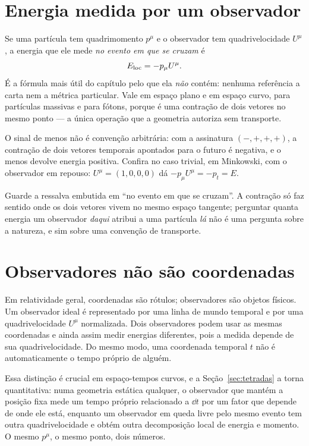 \documentclass[12pt,a4paper,oneside]{book}
\theoremstyle{rgplain}
\theoremstyle{rgremark}
\begin{document}
\section{Energia medida por um observador}
\label{sec:energia-observada}

\begin{central}
Se uma partícula tem quadrimomento $p^\mu$ e o observador tem quadrivelocidade
$U^\mu$, a energia que ele mede \emph{no evento em que se cruzam} é
\begin{equation}
  E_{\rm loc}=-p_\mu U^\mu .
  \label{eq:energia-medida}
\end{equation}
É a fórmula mais útil do capítulo pelo que ela \emph{não} contém: nenhuma
referência a carta nem a métrica particular. Vale em espaço plano e em espaço
curvo, para partículas massivas e para fótons, porque é uma contração de dois
vetores no mesmo ponto --- a única operação que a geometria autoriza sem
transporte.
\end{central}

O sinal de menos não é convenção arbitrária: com a assinatura $(-,+,+,+)$, a
contração de dois vetores temporais apontados para o futuro é negativa, e o
menos devolve energia positiva. Confira no caso trivial, em Minkowski, com o
observador em repouso: $U^\mu=(1,0,0,0)$ dá $-p_\mu U^\mu=-p_t=E$.

Guarde a ressalva embutida em ``no evento em que se cruzam''. A contração só
faz sentido onde os dois vetores vivem no mesmo espaço tangente; perguntar
quanta energia um observador \emph{daqui} atribui a uma partícula \emph{lá}
não é uma pergunta sobre a natureza, e sim sobre uma convenção de transporte.

\section{Observadores não são coordenadas}
\label{sec:observador-coordenada}

Em relatividade geral, coordenadas são rótulos; observadores são objetos
físicos. Um observador ideal é representado por uma linha de mundo temporal e
por uma quadrivelocidade $U^\mu$ normalizada. Dois observadores podem usar as
mesmas coordenadas e ainda assim medir energias diferentes, pois a medida
depende de sua quadrivelocidade. Do mesmo modo, uma coordenada temporal $t$ não
é automaticamente o tempo próprio de alguém.

Essa distinção é crucial em espaço-tempos curvos, e a
Seção~\ref{sec:tetradas} a torna quantitativa: numa geometria estática
qualquer, o observador que mantém a posição fixa mede um tempo próprio
relacionado a $\dd t$ por um fator que depende de onde ele está, enquanto um
observador em queda livre pelo mesmo evento tem outra quadrivelocidade e obtém
outra decomposição local de energia e momento. O mesmo $p^\mu$, o mesmo ponto,
dois números.
\end{document}
